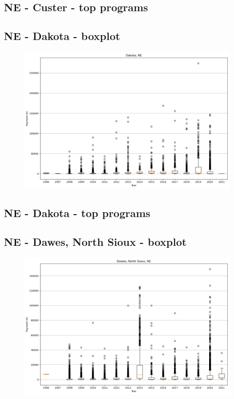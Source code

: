 \subsection*{NE - Custer - top programs}

\newpage
\subsection*{NE - Dakota - boxplot}
\begin{figure}[h]
\centering
\includegraphics[width=7in]{../output/boxplots/counties/Dakota-NE_boxplot.png}
\end{figure}


\subsection*{NE - Dakota - top programs}

\newpage
\subsection*{NE - Dawes, North Sioux - boxplot}
\begin{figure}[h]
\centering
\includegraphics[width=7in]{../output/boxplots/counties/Dawes, North Sioux-NE_boxplot.png}
\end{figure}



